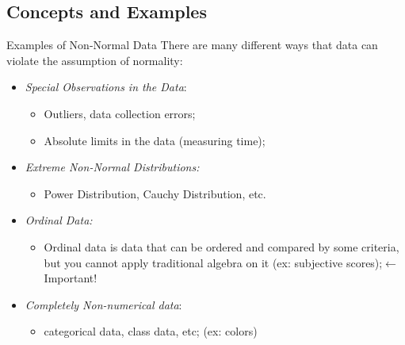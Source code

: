 \subsection{Concepts and Examples}

\begin{frame}{Examples of Non-Normal Data}
  There are many different ways that data can violate the assumption of normality:\bigskip

  \begin{itemize}
    \item \emph{Special Observations in the Data}:
      \begin{itemize}
        \item Outliers, data collection errors;
        \item Absolute limits in the data (measuring time);
      \end{itemize}

    \item \emph{Extreme Non-Normal Distributions:}
    \begin{itemize}
      \item Power Distribution, Cauchy Distribution, etc.
    \end{itemize}

    \item \emph{Ordinal Data:}
    \begin{itemize}
      \item Ordinal data is data that can be ordered and compared by some criteria, but you cannot apply traditional algebra on it (ex: subjective scores);\hfill $\leftarrow$\alert{Important!}
    \end{itemize}

    \item \emph{Completely Non-numerical data}:
    \begin{itemize}
      \item categorical data, class data, etc; (ex: colors)
    \end{itemize}
  \end{itemize}
\end{frame}


